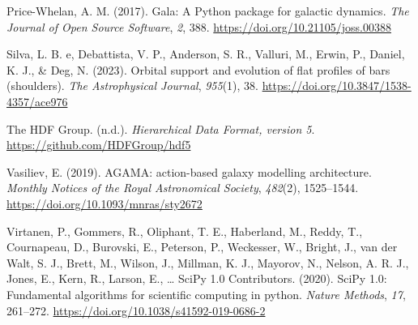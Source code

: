 \documentclass[12pt]{article}
\newlength{\cslhangindent}
\newenvironment{CSLReferences}[2] %
 {\begin{list}{}{%
  \setlength{\itemindent}{0pt}
  \setlength{\leftmargin}{0pt}
  \setlength{\parsep}{0pt}
  \ifodd #1
   \setlength{\leftmargin}{\cslhangindent}
   \setlength{\itemindent}{-1\cslhangindent}
  \fi
  \setlength{\itemsep}{#2\baselineskip}}}
 {\end{list}}
\begin{document}
\begin{CSLReferences}{1}{0}
Price-Whelan, A. M. (2017). {Gala: A Python package for galactic
dynamics}. \emph{The Journal of Open Source Software}, \emph{2}, 388.
\url{https://doi.org/10.21105/joss.00388}

Silva, L. B. e, Debattista, V. P., Anderson, S. R., Valluri, M., Erwin,
P., Daniel, K. J., \& Deg, N. (2023). Orbital support and evolution of
flat profiles of bars (shoulders). \emph{The Astrophysical Journal},
\emph{955}(1), 38. \url{https://doi.org/10.3847/1538-4357/ace976}

The HDF Group. (n.d.). \emph{{Hierarchical Data Format, version 5}}.
\url{https://github.com/HDFGroup/hdf5}

Vasiliev, E. (2019). {AGAMA: action-based galaxy modelling
architecture}. \emph{Monthly Notices of the Royal Astronomical Society},
\emph{482}(2), 1525--1544. \url{https://doi.org/10.1093/mnras/sty2672}

Virtanen, P., Gommers, R., Oliphant, T. E., Haberland, M., Reddy, T.,
Cournapeau, D., Burovski, E., Peterson, P., Weckesser, W., Bright, J.,
van der Walt, S. J., Brett, M., Wilson, J., Millman, K. J., Mayorov, N.,
Nelson, A. R. J., Jones, E., Kern, R., Larson, E., \ldots{} SciPy 1.0
Contributors. (2020). {SciPy} 1.0: Fundamental algorithms for scientific
computing in python. \emph{Nature Methods}, \emph{17}, 261--272.
\url{https://doi.org/10.1038/s41592-019-0686-2}

\end{CSLReferences}
\end{document}
